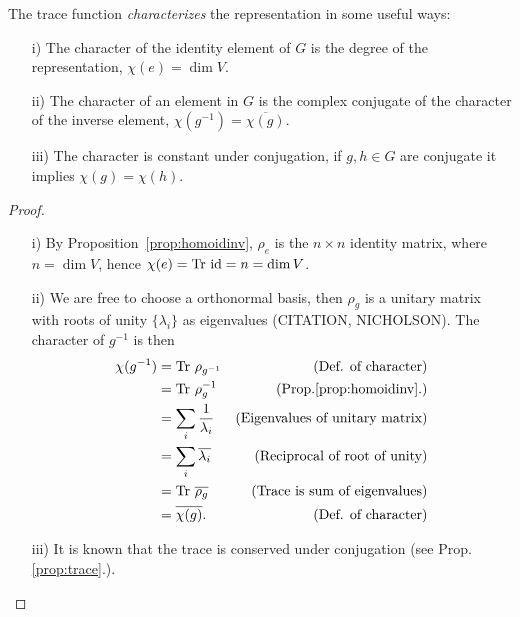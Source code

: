 \begin{proposition}\cite[Prop.2.1.]{Serre}\label{prop:charidinvconj}
	The trace function \emph{characterizes} the representation in some useful ways:
	\begin{enumerate}
		\item[i)] The character of the identity element of $G$ is the degree of the representation, $\chi(e) = \dim V$.
		\item[ii)] The character of an element in $G$ is the complex conjugate of the character of the inverse element, $\chi(g^{-1}) = \overline{\chi(g)}$.
		\item[iii)] The character is constant under conjugation, if $g,h\in G$ are conjugate it implies $\chi(g) = \chi(h)$.
	\end{enumerate}
\end{proposition}
\begin{proof}
	\begin{enumerate}
		\item[i)] By Proposition~\ref{prop:homoidinv}, $\rho_e$ is the $n \times n$ identity matrix, where $n = \dim V$, hence $\chi(e) = \text{Tr } \text{id} = n = \dim V$.
		\item[ii)] We are free to choose a orthonormal basis, then $\rho_g$ is a unitary matrix with roots of unity $\{\lambda_i\}$ as eigenvalues (CITATION, NICHOLSON). The character of $g^{-1}$ is then
		\begin{align*}
			\chi(g^{-1}) &= \text{Tr } \rho_{g^{-1}} & \text{(Def. of character)} \\
			&= \text{Tr } \rho_g^{-1} & \text{(Prop.\ref{prop:homoidinv}.)} \\
			&= \sum_i \frac{1}{\lambda_i} & \text{(Eigenvalues of unitary matrix)} \\
			&= \sum_i \overline{\lambda_i} & \text{(Reciprocal of root of unity)} \\
			&= \text{Tr } \overline{\rho_g} & \text{(Trace is sum of eigenvalues)} \\
			&= \overline{\chi(g)}. & \text{(Def. of character)}
		\end{align*}
		\item[iii)] It is known that the trace is conserved under conjugation (see Prop.\ref{prop:trace}.).\qedhere
	\end{enumerate}
\end{proof}


